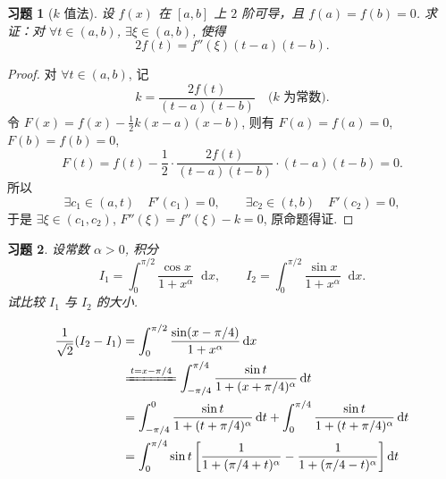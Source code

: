 \documentclass{ctexart}
\renewcommand\dif{\mathop{}\!\mathrm{d}}
\newcommand{\dx}{\ensuremath{\dif x}}
\newcommand{\dt}{\ensuremath{\dif t}}
\theoremstyle{plain}
\newtheorem{exercise}{习题}[subsection]
\theoremstyle{definition}
\begin{document}
\begin{exercise}[$k$ 值法]
    设 $f(x)$ 在 $[a, b]$ 上 $2$ 阶可导，且 $f(a) = f(b) = 0$. 求证：对 $\forall t \in (a, b)$, $\exists \xi \in (a, b)$, 使得
    \[
        2f(t) = f''(\xi) (t - a) (t - b).
    \]
\end{exercise}

\begin{proof}
    对 $\forall t \in (a, b)$, 记
    \[
        k = \frac{2f(t)}{(t - a)(t - b)} \quad\text{($k$ 为常数)}.
    \]
    令 $F(x) = f(x) - \frac 12 k(x - a)(x - b)$, 则有 $F(a) = f(a) = 0$, $F(b) = f(b) = 0$, 
    \[
        F(t) = f(t) - \frac 12 \cdot \frac{2f(t)}{(t - a)(t - b)} \cdot (t - a)(t - b)
        = 0.
    \]
    所以
    \[
        \exists c_1 \in (a, t) \quad F'(c_1) = 0,
        \qquad
        \exists c_2 \in (t, b) \quad F'(c_2) = 0,
    \]
    于是 $\exists \xi \in (c_1, c_2)$, $F''(\xi) = f''(\xi) - k = 0$, 原命题得证.
\end{proof}

\begin{exercise}
    设常数 $\alpha > 0$, 积分
    \[
        I_1 = \int_0^{\pi / 2} \frac{\cos x}{1 + x^\alpha} \dx,
        \qquad
        I_2 = \int_0^{\pi / 2} \frac{\sin x}{1 + x^\alpha} \dx.
    \]
    试比较 $I_1$ 与 $I_2$ 的大小.
\end{exercise}

\begin{align*}
    \frac{1}{\sqrt{2}}(I_2 - I_1)
    &= \int_0^{\pi / 2} \frac{\sin(x - \pi/4)}{1 + x^\alpha} \dx \\
    &\xlongequal{t = x - \pi/4} \int_{-\pi/4}^{\pi/4} \frac{\sin t}{1 + (x + \pi/4)^\alpha} \dt \\
    &= \int_{-\pi/4}^{0} \frac{\sin t}{1 + (t + \pi/4)^\alpha} \dt
        + \int_{0}^{\pi/4} \frac{\sin t}{1 + (t + \pi/4)^\alpha} \dt \\
    &= \int_{0}^{\pi/4} \sin t \sbr[3]{\frac{1}{1 + (\pi/4 + t)^\alpha}
        - \frac{1}{1 + (\pi/4 - t)^\alpha}} \dt \\
\end{align*}
\end{document}
